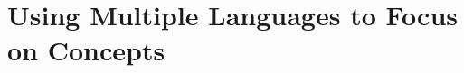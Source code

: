 
\section{Using Multiple Languages to Focus on Concepts} %
\label{sec:using_multiple_languages_to_focus_on_concepts}


